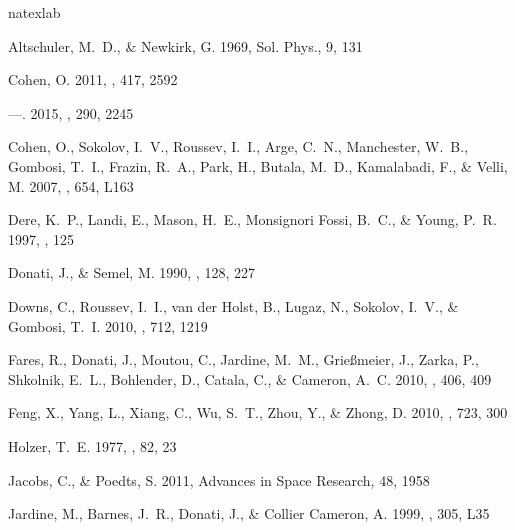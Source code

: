 \documentclass[apj]{emulateapj}
\begin{document}
\begin{thebibliography}{42}
\expandafter\ifx\csname natexlab\endcsname\relax\def\natexlab#1{#1}\fi

{Altschuler}, M.~D., \& {Newkirk}, G. 1969, Sol. Phys., 9, 131

{Cohen}, O. 2011, \mnras, 417, 2592

---. 2015, \solphys, 290, 2245

{Cohen}, O., {Sokolov}, I.~V., {Roussev}, I.~I., {Arge}, C.~N., {Manchester},
  W.~B., {Gombosi}, T.~I., {Frazin}, R.~A., {Park}, H., {Butala}, M.~D.,
  {Kamalabadi}, F., \& {Velli}, M. 2007, \apj, 654, L163

{Dere}, K.~P., {Landi}, E., {Mason}, H.~E., {Monsignori Fossi}, B.~C., \&
  {Young}, P.~R. 1997, \aaps, 125

{Donati}, J., \& {Semel}, M. 1990, \solphys, 128, 227

{Downs}, C., {Roussev}, I.~I., {van der Holst}, B., {Lugaz}, N., {Sokolov},
  I.~V., \& {Gombosi}, T.~I. 2010, \apj, 712, 1219

{Fares}, R., {Donati}, J., {Moutou}, C., {Jardine}, M.~M., {Grie{\ss}meier},
  J., {Zarka}, P., {Shkolnik}, E.~L., {Bohlender}, D., {Catala}, C., \&
  {Cameron}, A.~C. 2010, \mnras, 406, 409

{Feng}, X., {Yang}, L., {Xiang}, C., {Wu}, S.~T., {Zhou}, Y., \& {Zhong}, D.
  2010, \apj, 723, 300

{Holzer}, T.~E. 1977, \jgr, 82, 23

{Jacobs}, C., \& {Poedts}, S. 2011, Advances in Space Research, 48, 1958

{Jardine}, M., {Barnes}, J.~R., {Donati}, J., \& {Collier Cameron}, A. 1999,
  \mnras, 305, L35


\end{thebibliography}
\end{document}
